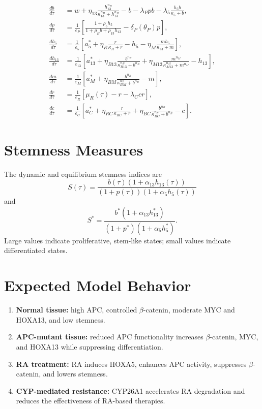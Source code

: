 \documentclass[11pt]{article}
\begin{document}
\begin{align}
\frac{db}{d\tau}
&=
w+\eta_{13}\frac{h_{13}^{n_H}}
{\kappa_{13}^{n_H}+h_{13}^{n_H}}
-b-\lambda_Ppb-\lambda_5\frac{h_5b}{\kappa_5+b},
\\
\frac{dp}{d\tau}
&=
\frac{1}{\varepsilon_P}
\left[
\frac{1+\rho_5h_5}{1+\rho_Bb+\rho_{13}h_{13}}
-\delta_P(\theta_P)p
\right],
\\
\frac{dh_5}{d\tau}
&=
\frac{1}{\varepsilon_5}
\left[
a_5^*+\eta_R\frac{r}{\kappa_R+r}
-h_5-\eta_M\frac{mh_5}{\kappa_M+m}
\right],
\\
\frac{dh_{13}}{d\tau}
&=
\frac{1}{\varepsilon_{13}}
\left[
a_{13}^*
+\eta_{B13}\frac{b^{n_B}}{\kappa_{B13}^{n_B}+b^{n_B}}
+\eta_{M13}\frac{m^{n_M}}{\kappa_{M13}^{n_M}+m^{n_M}}
-h_{13}
\right],
\\
\frac{dm}{d\tau}
&=
\frac{1}{\varepsilon_M}
\left[
a_M^*+\eta_{BM}\frac{b^{n_B}}
{\kappa_{BM}^{n_B}+b^{n_B}}-m
\right],
\\
\frac{dr}{d\tau}
&=
\frac{1}{\varepsilon_R}
\left[\mu_R(\tau)-r-\lambda_Ccr\right],
\\
\frac{dc}{d\tau}
&=
\frac{1}{\varepsilon_C}
\left[
a_C^*+\eta_{RC}\frac{r}{\kappa_{RC}+r}
+\eta_{BC}\frac{b^{n_B}}{\kappa_{BC}^{n_B}+b^{n_B}}-c
\right].
\end{align}

\section{Stemness Measures}

The dynamic and equilibrium stemness indices are
\[
\boxed{
S(\tau)=
\frac{b(\tau)\left(1+\alpha_{13}h_{13}(\tau)\right)}
{\left(1+p(\tau)\right)\left(1+\alpha_5h_5(\tau)\right)}
}
\]
and
\[
\boxed{
S^*=
\frac{b^*\left(1+\alpha_{13}h_{13}^*\right)}
{\left(1+p^*\right)\left(1+\alpha_5h_5^*\right)}.
}
\]
Large values indicate proliferative, stem-like states; small values indicate
differentiated states.

\section{Expected Model Behavior}

\begin{enumerate}
\item \textbf{Normal tissue:} high APC, controlled \(\beta\)-catenin,
moderate MYC and HOXA13, and low stemness.
\item \textbf{APC-mutant tissue:} reduced APC functionality increases
\(\beta\)-catenin, MYC, and HOXA13 while suppressing differentiation.
\item \textbf{RA treatment:} RA induces HOXA5, enhances APC activity,
suppresses \(\beta\)-catenin, and lowers stemness.
\item \textbf{CYP-mediated resistance:} CYP26A1 accelerates RA degradation
and reduces the effectiveness of RA-based therapies.
\end{enumerate}
\end{document}
